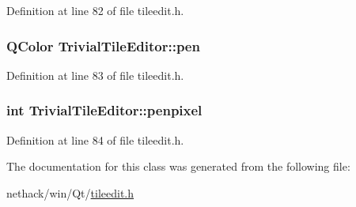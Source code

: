 Definition at line 82 of file tileedit.\+h.

\hypertarget{classTrivialTileEditor_a0aaa7991d0ecdbca254a8f07bd75ff7f}{
\subsubsection[{pen}]{\setlength{\rightskip}{0pt plus 5cm}Q\+Color Trivial\+Tile\+Editor\+::pen\hspace{0.3cm}{\ttfamily [private]}}}\label{classTrivialTileEditor_a0aaa7991d0ecdbca254a8f07bd75ff7f}


Definition at line 83 of file tileedit.\+h.

\hypertarget{classTrivialTileEditor_ad447df9659c17cfdd9d224a83a8a48d4}{
\subsubsection[{penpixel}]{\setlength{\rightskip}{0pt plus 5cm}int Trivial\+Tile\+Editor\+::penpixel\hspace{0.3cm}{\ttfamily [private]}}}\label{classTrivialTileEditor_ad447df9659c17cfdd9d224a83a8a48d4}


Definition at line 84 of file tileedit.\+h.



The documentation for this class was generated from the following file\+:\begin{DoxyCompactItemize}
\item 
nethack/win/\+Qt/\hyperlink{tileedit_8h}{tileedit.\+h}\end{DoxyCompactItemize}

